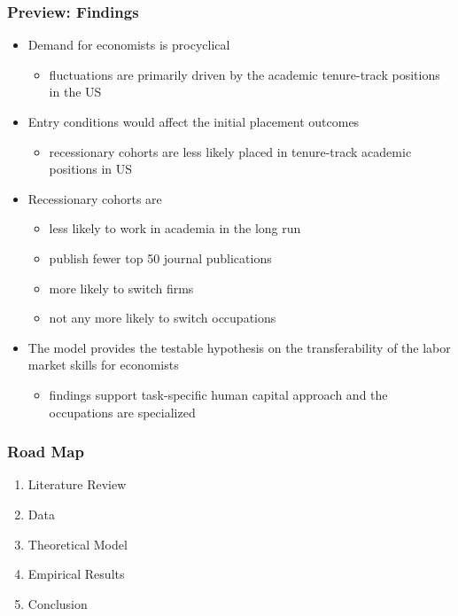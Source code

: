 \documentclass[11pt]{beamer}
\begin{document}
\begin{frame}
	\frametitle{Preview: Findings}
	\begin{itemize}
			\item Demand for economists is procyclical
			\begin{itemize}
				\item fluctuations are primarily driven by the academic tenure-track positions in the US
			\end{itemize}
			\vspace{1mm}
			\item Entry conditions would affect the initial placement outcomes
			\begin{itemize}
				\item  recessionary cohorts are less likely placed in tenure-track academic positions in US
			\end{itemize}
			\vspace{1mm}
			\item Recessionary cohorts are 
			\begin{itemize}
				\item less likely to work in academia in the long run
				\item publish fewer top 50 journal publications
				\item more likely to switch firms
				\item not any more likely to switch occupations
			\end{itemize}
%			
\vspace{1mm}
\item The model provides the testable hypothesis on the transferability of the labor market skills for economists 
			\begin{itemize}
				\item findings support task-specific human capital approach and the occupations are specialized
			\end{itemize}
	\end{itemize}
\end{frame}


\begin{frame}
	\frametitle{Road Map}
\begin{enumerate}
	\item Literature Review
	\vspace{2.6 mm}
	\item Data
	\vspace{2.6 mm}
	\item Theoretical Model
	\vspace{2.6 mm}  
	\item Empirical Results
	\vspace{2.6 mm}  
	\item Conclusion
\end{enumerate}

\end{frame}
\end{document}
